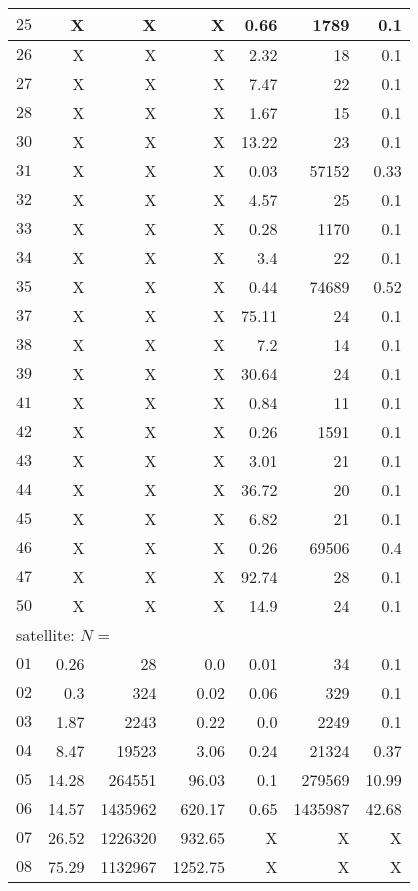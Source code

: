 \begin{longtable}{|c||r|r|r||r|r|r|}
$25$ &  X &  X &  X & 0.66 & 1789 & 0.1 \\\hline
$26$ &  X &  X &  X & 2.32 & 18 & 0.1 \\\hline
$27$ &  X &  X &  X & 7.47 & 22 & 0.1 \\\hline
$28$ &  X &  X &  X & 1.67 & 15 & 0.1 \\\hline
$30$ &  X &  X &  X & 13.22 & 23 & 0.1 \\\hline
$31$ &  X &  X &  X & 0.03 & 57152 & 0.33 \\\hline
$32$ &  X &  X &  X & 4.57 & 25 & 0.1 \\\hline
$33$ &  X &  X &  X & 0.28 & 1170 & 0.1 \\\hline
$34$ &  X &  X &  X & 3.4 & 22 & 0.1 \\\hline
$35$ &  X &  X &  X & 0.44 & 74689 & 0.52 \\\hline
$37$ &  X &  X &  X & 75.11 & 24 & 0.1 \\\hline
$38$ &  X &  X &  X & 7.2 & 14 & 0.1 \\\hline
$39$ &  X &  X &  X & 30.64 & 24 & 0.1 \\\hline
$41$ &  X &  X &  X & 0.84 & 11 & 0.1 \\\hline
$42$ &  X &  X &  X & 0.26 & 1591 & 0.1 \\\hline
$43$ &  X &  X &  X & 3.01 & 21 & 0.1 \\\hline
$44$ &  X &  X &  X & 36.72 & 20 & 0.1 \\\hline
$45$ &  X &  X &  X & 6.82 & 21 & 0.1 \\\hline
$46$ &  X &  X &  X & 0.26 & 69506 & 0.4 \\\hline
$47$ &  X &  X &  X & 92.74 & 28 & 0.1 \\\hline
$50$ &  X &  X &  X & 14.9 & 24 & 0.1 \\\hline

\multicolumn{7}{|l|}{satellite: $N=$}\\\hline
$01$ & 0.26 & 28 & 0.0 & 0.01 & 34 & 0.1 \\\hline
$02$ & 0.3 & 324 & 0.02 & 0.06 & 329 & 0.1 \\\hline
$03$ & 1.87 & 2243 & 0.22 & 0.0 & 2249 & 0.1 \\\hline
$04$ & 8.47 & 19523 & 3.06 & 0.24 & 21324 & 0.37 \\\hline
$05$ & 14.28 & 264551 & 96.03 & 0.1 & 279569 & 10.99 \\\hline
$06$ & 14.57 & 1435962 & 620.17 & 0.65 & 1435987 & 42.68 \\\hline
$07$ & 26.52 & 1226320 & 932.65 & X & X & X \\\hline
$08$ & 75.29 & 1132967 & 1252.75 & X & X & X \\\hline


\end{longtable}
